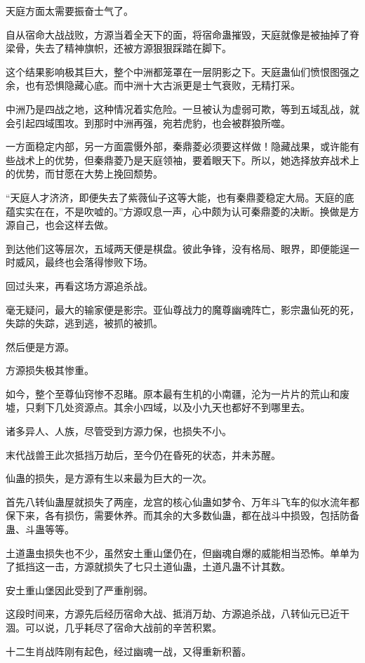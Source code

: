 \begin{this_body}
天庭方面太需要振奋士气了。

自从宿命大战战败，方源当着全天下的面，将宿命蛊摧毁，天庭就像是被抽掉了脊梁骨，失去了精神旗帜，还被方源狠狠踩踏在脚下。

这个结果影响极其巨大，整个中洲都笼罩在一层阴影之下。天庭蛊仙们愤恨图强之余，也有恐惧隐藏心底。而中洲十大古派更是士气衰败，无精打采。

中洲乃是四战之地，这种情况着实危险。一旦被认为虚弱可欺，等到五域乱战，就会引起四域围攻。到那时中洲再强，宛若虎豹，也会被群狼所噬。

一方面稳定内部，另一方面震慑外部，秦鼎菱必须要这样做！隐藏战果，或许能有些战术上的优势，但秦鼎菱乃是天庭领袖，要着眼天下。所以，她选择放弃战术上的优势，而甘愿在大势上挽回颓势。

“天庭人才济济，即便失去了紫薇仙子这等大能，也有秦鼎菱稳定大局。天庭的底蕴实实在在，不是吹嘘的。”方源叹息一声，心中颇为认可秦鼎菱的决断。换做是方源自己，也会这样去做。

到达他们这等层次，五域两天便是棋盘。彼此争锋，没有格局、眼界，即便能逞一时威风，最终也会落得惨败下场。

回过头来，再看这场方源追杀战。

毫无疑问，最大的输家便是影宗。亚仙尊战力的魔尊幽魂阵亡，影宗蛊仙死的死，失踪的失踪，逃到逃，被抓的被抓。

然后便是方源。

方源损失极其惨重。

如今，整个至尊仙窍惨不忍睹。原本最有生机的小南疆，沦为一片片的荒山和废墟，只剩下几处资源点。其余小四域，以及小九天也都好不到哪里去。

诸多异人、人族，尽管受到方源力保，也损失不小。

末代战兽王此次抵挡万劫后，至今仍在昏死的状态，并未苏醒。

仙蛊的损失，是方源有生以来最为巨大的一次。

首先八转仙蛊屋就损失了两座，龙宫的核心仙蛊如梦令、万年斗飞车的似水流年都保下来，各有损伤，需要休养。而其余的大多数仙蛊，都在战斗中损毁，包括防备蛊、斗蛊等等。

土道蛊虫损失也不少，虽然安土重山堡仍在，但幽魂自爆的威能相当恐怖。单单为了抵挡这一击，方源就损失了七只土道仙蛊，土道凡蛊不计其数。

安土重山堡因此受到了严重削弱。

这段时间来，方源先后经历宿命大战、抵消万劫、方源追杀战，八转仙元已近干涸。可以说，几乎耗尽了宿命大战前的辛苦积累。

十二生肖战阵刚有起色，经过幽魂一战，又得重新积蓄。


\end{this_body}
